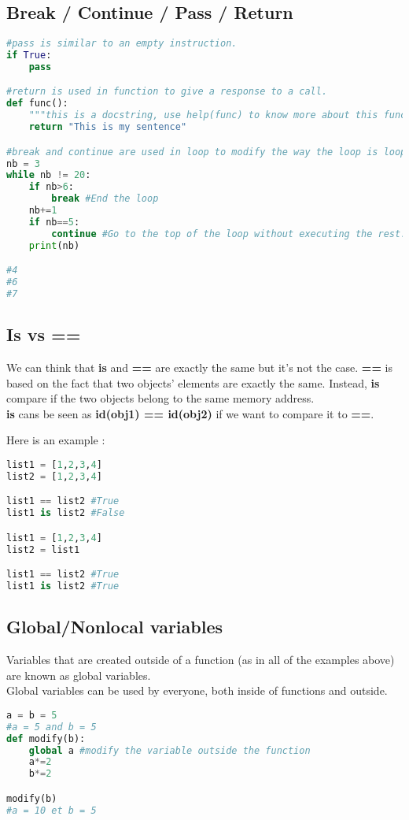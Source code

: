 \documentclass[a4paper, 12pt, titlepage]{scrartcl} %
\begin{document}
\subsection{Break / Continue / Pass / Return}
\label{subsec:BCPR}
\begin{lstlisting}[language=Python]
#pass is similar to an empty instruction.
if True:
    pass

#return is used in function to give a response to a call.
def func():
	"""this is a docstring, use help(func) to know more about this function."""
	return "This is my sentence"

#break and continue are used in loop to modify the way the loop is looping.
nb = 3
while nb != 20:
	if nb>6:
		break #End the loop
	nb+=1
	if nb==5:
		continue #Go to the top of the loop without executing the rest.	
	print(nb)

#4
#6
#7
\end{lstlisting} \vspace{5mm}

\subsection{Is vs ==}
\label{subsec:Is}
We can think that \textbf{is} and \textbf{==} are exactly the same but it's not the case. \textbf{==} is based on the fact that two objects' elements are exactly the same. Instead, \textbf{is} compare if the two objects belong to the same memory address.\\
\textbf{is} cans be seen as \textbf{id(obj1) == id(obj2)} if we want to compare it to \textbf{==}.

\vspace{5mm}

Here is an example :
\begin{lstlisting}[language=Python]
list1 = [1,2,3,4]
list2 = [1,2,3,4]

list1 == list2 #True
list1 is list2 #False

list1 = [1,2,3,4]
list2 = list1

list1 == list2 #True
list1 is list2 #True
\end{lstlisting} \vspace{5mm}

\subsection{Global/Nonlocal variables}
\label{subsec:Global/Nonlocal}
Variables that are created outside of a function (as in all of the examples above) are known as global variables.\\
Global variables can be used by everyone, both inside of functions and outside.
\begin{lstlisting}[language=Python]
a = b = 5
#a = 5 and b = 5
def modify(b):
	global a #modify the variable outside the function
	a*=2
	b*=2

modify(b)
#a = 10 et b = 5
\end{lstlisting} \vspace{5mm}
\end{document}
